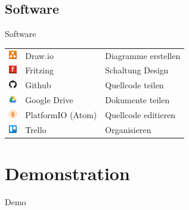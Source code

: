 \documentclass[mathserif,9pt]{beamer}
\begin{document}
    \subsection{Software}
    \begin{frame}{Software}
        \begin{block}{}
            \begin{tabular}{cll}
                \includegraphics[width=3.5mm]{img/drawio.png} & Draw.io & Diagramme erstellen \\
                \includegraphics[width=3.5mm]{img/fritzing.png} & Fritzing & Schaltung Design \\
                \includegraphics[width=3.5mm]{img/github.png} & Github & Quellcode teilen \\
                \includegraphics[width=3.5mm]{img/googledrive.png} & Google Drive & Dokumente teilen \\
                \includegraphics[width=3.5mm]{img/platformio.png} & PlatformIO (Atom) & Quellcode editieren \\
                \includegraphics[width=3.5mm]{img/trello.png} & Trello & Organisieren \\
            \end{tabular}
        \end{block}
    \end{frame}
    \section{Demonstration}
    \begin{frame}
        \begin{block}{}
            \centering
						{\fontsize{51.59}{51.59}\selectfont Demo}
        \end{block}
    \end{frame}
\end{document}
